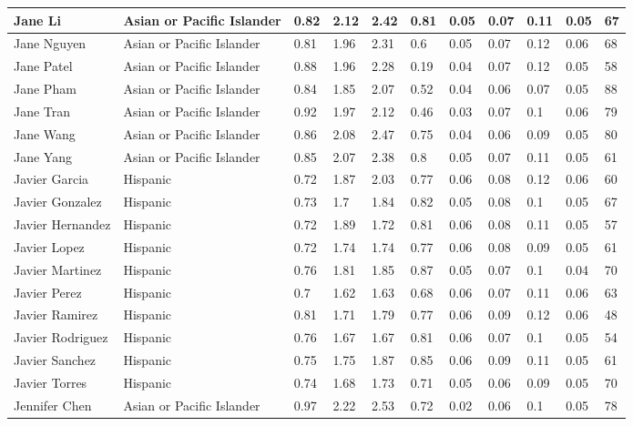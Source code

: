 \begin{table}[!ht]
\begin{tabular}{|l|l|l|l|l|l|l|l|l|l|l|}
        Jane Li & Asian or Pacific Islander & 0.82 & 2.12 & 2.42 & 0.81 & 0.05 & 0.07 & 0.11 & 0.05 & 67 \\ \hline
        Jane Nguyen & Asian or Pacific Islander & 0.81 & 1.96 & 2.31 & 0.6 & 0.05 & 0.07 & 0.12 & 0.06 & 68 \\ \hline
        Jane Patel & Asian or Pacific Islander & 0.88 & 1.96 & 2.28 & 0.19 & 0.04 & 0.07 & 0.12 & 0.05 & 58 \\ \hline
        Jane Pham & Asian or Pacific Islander & 0.84 & 1.85 & 2.07 & 0.52 & 0.04 & 0.06 & 0.07 & 0.05 & 88 \\ \hline
        Jane Tran & Asian or Pacific Islander & 0.92 & 1.97 & 2.12 & 0.46 & 0.03 & 0.07 & 0.1 & 0.06 & 79 \\ \hline
        Jane Wang & Asian or Pacific Islander & 0.86 & 2.08 & 2.47 & 0.75 & 0.04 & 0.06 & 0.09 & 0.05 & 80 \\ \hline
        Jane Yang & Asian or Pacific Islander & 0.85 & 2.07 & 2.38 & 0.8 & 0.05 & 0.07 & 0.11 & 0.05 & 61 \\ \hline
        Javier Garcia & Hispanic & 0.72 & 1.87 & 2.03 & 0.77 & 0.06 & 0.08 & 0.12 & 0.06 & 60 \\ \hline
        Javier Gonzalez & Hispanic & 0.73 & 1.7 & 1.84 & 0.82 & 0.05 & 0.08 & 0.1 & 0.05 & 67 \\ \hline
        Javier Hernandez & Hispanic & 0.72 & 1.89 & 1.72 & 0.81 & 0.06 & 0.08 & 0.11 & 0.05 & 57 \\ \hline
        Javier Lopez & Hispanic & 0.72 & 1.74 & 1.74 & 0.77 & 0.06 & 0.08 & 0.09 & 0.05 & 61 \\ \hline
        Javier Martinez & Hispanic & 0.76 & 1.81 & 1.85 & 0.87 & 0.05 & 0.07 & 0.1 & 0.04 & 70 \\ \hline
        Javier Perez & Hispanic & 0.7 & 1.62 & 1.63 & 0.68 & 0.06 & 0.07 & 0.11 & 0.06 & 63 \\ \hline
        Javier Ramirez & Hispanic & 0.81 & 1.71 & 1.79 & 0.77 & 0.06 & 0.09 & 0.12 & 0.06 & 48 \\ \hline
        Javier Rodriguez & Hispanic & 0.76 & 1.67 & 1.67 & 0.81 & 0.06 & 0.07 & 0.1 & 0.05 & 54 \\ \hline
        Javier Sanchez & Hispanic & 0.75 & 1.75 & 1.87 & 0.85 & 0.06 & 0.09 & 0.11 & 0.05 & 61 \\ \hline
        Javier Torres & Hispanic & 0.74 & 1.68 & 1.73 & 0.71 & 0.05 & 0.06 & 0.09 & 0.05 & 70 \\ \hline
        Jennifer Chen & Asian or Pacific Islander & 0.97 & 2.22 & 2.53 & 0.72 & 0.02 & 0.06 & 0.1 & 0.05 & 78 \\ \hline

\end{tabular}
\end{table}
